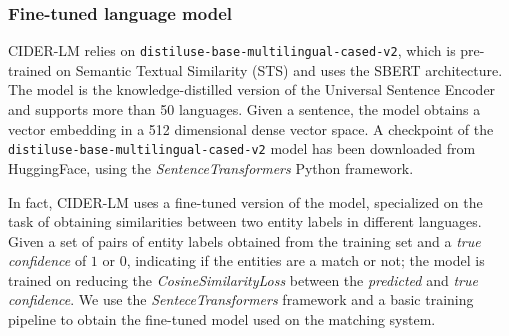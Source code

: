 \documentclass[
]{ceurart}
\begin{document}



\subsubsection{Fine-tuned language model}



 CIDER-LM relies on \verb|distiluse-base-multilingual-cased-v2|, which is pre-trained on Semantic Textual Similarity (STS) and uses the SBERT architecture. The model is the knowledge-distilled version of the Universal Sentence Encoder and supports more than 50 languages. Given a sentence, the model obtains a vector embedding in a  512 dimensional dense vector space.
 A checkpoint of the \verb|distiluse-base-multilingual-cased-v2| model has been downloaded from HuggingFace, using the \textit{SentenceTransformers} Python framework.

 
 In fact, CIDER-LM uses a fine-tuned version of the model, specialized on the task of obtaining similarities between two entity labels in different languages. Given a set of pairs of entity labels obtained from the training set and a \textit{true confidence} of $1$ or $0$, indicating if the entities are a match or not; the model is trained on reducing the \textit{CosineSimilarityLoss} between the \textit{predicted} and \textit{true confidence}. We use the \textit{SenteceTransformers} framework and a basic training pipeline to obtain the fine-tuned model used on the matching system. 
\end{document}
